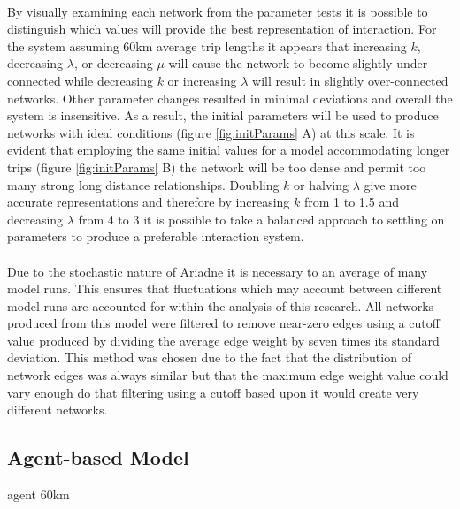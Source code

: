 \documentclass[12pt,a4paper]{thesis}
\begin{document}
\paragraph{}
By visually examining each network from the parameter tests it is possible to distinguish which values will provide the best representation of interaction. For the system assuming 60km average trip lengths it appears that increasing $k$, decreasing $\lambda$, or decreasing $\mu$ will cause the network to become slightly under-connected while decreasing $k$ or increasing $\lambda$ will result in slightly over-connected networks. Other parameter changes resulted in minimal deviations and overall the system is insensitive. As a result, the initial parameters will be used to produce networks with ideal conditions (figure \ref{fig:initParams} A) at this scale. It is evident that employing the same initial values for a model accommodating longer trips (figure \ref{fig:initParams} B) the network will be too dense and permit too many strong long distance relationships. Doubling $k$ or halving $\lambda$ give more accurate representations and therefore by increasing $k$ from 1 to 1.5 and decreasing $\lambda$ from 4 to 3 it is possible to take a balanced approach to settling on parameters to produce a preferable interaction system.

\paragraph{}
Due to the stochastic nature of Ariadne it is necessary to an average of many model runs. This ensures that fluctuations which may account between different model runs are accounted for within the analysis of this research. 
All networks produced from this model were filtered to remove near-zero edges using a cutoff value produced by dividing the average edge weight by seven times its standard deviation. This method was chosen due to the fact that the distribution of network edges was always similar but that the maximum edge weight value could vary enough do that filtering using a cutoff based upon it would create very different networks.  


\subsection{Agent-based Model}

agent 60km
\end{document}
